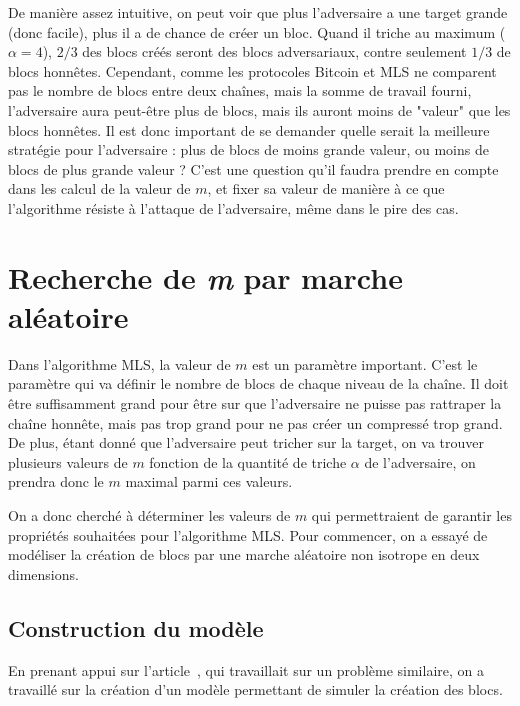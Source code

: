 	De manière assez intuitive, on peut voir que plus l'adversaire a une target
	grande (donc facile), plus il a de chance de créer un bloc. Quand il triche au
	maximum ($\alpha = 4$), $2/3$ des blocs créés seront des blocs adversariaux,
	contre seulement $1/3$ de blocs honnêtes. Cependant, comme les protocoles
	Bitcoin et MLS ne comparent pas le nombre de blocs entre deux chaînes, mais la
	somme de travail fourni, l'adversaire aura peut-être plus de blocs, mais ils
	auront moins de "valeur" que les blocs honnêtes. Il est donc important de se
	demander quelle serait la meilleure stratégie pour l'adversaire : plus de
	blocs de moins grande valeur, ou moins de blocs de plus grande valeur ? C'est
	une question qu'il faudra prendre en compte dans les calcul de la valeur de
	$m$, et fixer sa valeur de manière à ce que l'algorithme résiste à l'attaque
	de l'adversaire, même dans le pire des cas.


\section{Recherche de \textit{m} par marche
aléatoire}\label{sec:recherche-m-alea}

	Dans l'algorithme MLS, la valeur de $m$ est un paramètre important. C'est le
	paramètre qui va définir le nombre de blocs de chaque niveau de la chaîne. Il
	doit être suffisamment grand pour être sur que l'adversaire ne puisse pas
	rattraper la chaîne honnête, mais pas trop grand pour ne pas créer un
	compressé trop grand. De plus, étant donné que l'adversaire peut tricher sur
	la target, on va trouver plusieurs valeurs de $m$ fonction de la quantité de
	triche $\alpha$ de l'adversaire, on prendra donc le $m$ maximal parmi ces
	valeurs.

	On a donc cherché à déterminer les valeurs de $m$ qui permettraient de
	garantir les propriétés souhaitées pour l'algorithme MLS. Pour commencer, on a
	essayé de modéliser la création de blocs par une marche aléatoire non isotrope
	en deux dimensions.


	\subsection{Construction du modèle}\label{subsec:walk-construction-modele}

	En prenant appui sur l'article~\cite{nca}, qui travaillait sur un problème
	similaire, on a travaillé sur la création d'un modèle permettant de simuler
	la création des blocs. 

